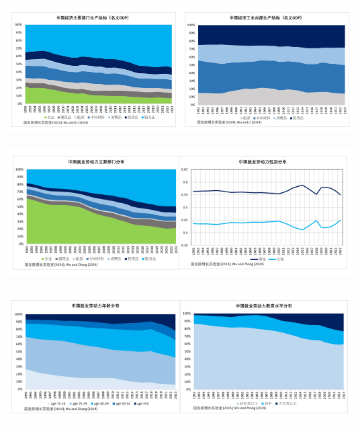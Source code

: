 \documentclass[lang=cn,10pt,green]{elegantbook}
\begin{document}
\newpage

\begin{figure}[htbp] %
  \centering
  \begin{subfigure}[b]{0.9\textwidth}
    \includegraphics[width=\linewidth]{image/中国经济主要行业构成.png}
    \label{fig:industry}
  \end{subfigure}
\begin{subfigure}[b]{0.9\textwidth}
    \includegraphics[width=\linewidth]{image/中国就业劳动力行业分布.png}
    \label{fig:labor_industry}
  \end{subfigure}
\begin{subfigure}[b]{0.9\textwidth}
    \includegraphics[width=\linewidth]{image/中国就业劳动力年龄与教育.png} %
    \label{fig:labor_age_edu}
  \end{subfigure}
  \label{fig:combined}
\end{figure}
\newpage
\end{document}
